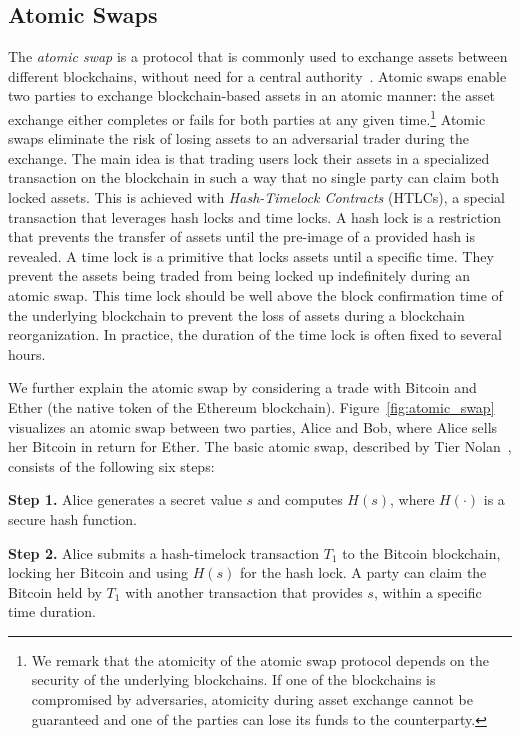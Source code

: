 \subsection{Atomic Swaps}
The \emph{atomic swap} is a protocol that is commonly used to exchange assets between different blockchains, without need for a central authority~\cite{herlihy2018atomic}.
Atomic swaps enable two parties to exchange blockchain-based assets in an atomic manner: the asset exchange either completes or fails for both parties at any given time.\footnote{We remark that the atomicity of the atomic swap protocol depends on the security of the underlying blockchains. If one of the blockchains is compromised by adversaries, atomicity during asset exchange cannot be guaranteed and one of the parties can lose its funds to the counterparty.}
Atomic swaps eliminate the risk of losing assets to an adversarial trader during the exchange.
The main idea is that trading users lock their assets in a specialized transaction on the blockchain in such a way that no single party can claim both locked assets.
This is achieved with \emph{Hash-Timelock Contracts} (HTLCs), a special transaction that leverages hash locks and time locks.
A hash lock is a restriction that prevents the transfer of assets until the pre-image of a provided hash is revealed.
A time lock is a primitive that locks assets until a specific time.
They prevent the assets being traded from being locked up indefinitely during an atomic swap.
This time lock should be well above the block confirmation time of the underlying blockchain to prevent the loss of assets during a blockchain reorganization.
In practice, the duration of the time lock is often fixed to several hours.

We further explain the atomic swap by considering a trade with Bitcoin and Ether (the native token of the Ethereum blockchain).
Figure~\ref{fig:atomic_swap} visualizes an atomic swap between two parties, Alice and Bob, where Alice sells her Bitcoin in return for Ether.
The basic atomic swap, described by Tier Nolan~\cite{nolan2016atomic}, consists of the following six steps:

\textbf{Step 1.} Alice generates a secret value $ s $ and computes $ H(s) $, where $ H(\cdot) $ is a secure hash function.

\textbf{Step 2.} Alice submits a hash-timelock transaction $ T_1 $ to the Bitcoin blockchain, locking her Bitcoin and using $ H(s) $ for the hash lock. A party can claim the Bitcoin held by $ T_1 $ with another transaction that provides $ s $, within a specific time duration.

